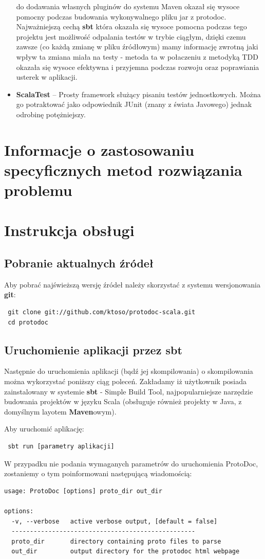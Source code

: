 \documentclass[a4paper]{article}
\begin{document}
\begin{itemize}
                                           do dodawania własnych pluginów do systemu Maven okazał się wysoce pomocny podczas budowania wykonywalnego pliku jar z protodoc.
                                           Najważniejszą cechą \textbf{sbt} która okazała się wysoce pomocna podczas tego projektu jest możliwość odpalania testów w trybie ciągłym,
                                           dzięki czemu zawsze (co każdą zmianę w pliku źródłowym) mamy informację zwrotną jaki wpływ ta zmiana miała na testy - metoda
                                           ta w połaczeniu z metodyką TDD okazała się wysoce efektywna i przyjemna podczas rozwoju oraz poprawiania usterek w aplikacji.
 \item \textbf{ScalaTest} -- Prosty framework służący pisaniu testów jednostkowych. Można go potraktować jako odpowiednik JUnit (znany z świata Javowego) jednak odrobinę potężniejszy.
\end{itemize}


\newpage
\section{Informacje o zastosowaniu specyficznych metod rozwiązania problemu}

\section{Instrukcja obsługi}
\subsection{Pobranie aktualnych źródeł}
Aby pobrać najświeższą wersję źródeł należy skorzystać z systemu wersjonowania \textbf{git}:
\begin{verbatim}
 git clone git://github.com/ktoso/protodoc-scala.git
 cd protodoc
\end{verbatim}

\subsection{Uruchomienie aplikacji przez sbt}
Następnie do uruchomienia aplikacji (bądź jej skompilowania) o skompilowania można wykorzystać poniższy ciąg poleceń.
Zakładamy iż użytkownik posiada zainstalowany w systemie \textbf{sbt} - Simple Build Tool, najpopularniejsze narzędzie budowania 
projektów w języku Scala (obsługuje również projekty w Java, z domyślnym layotem \textbf{Maven}owym).

Aby uruchomić aplikację:
\begin{verbatim}
 sbt run [parametry aplikacji]
\end{verbatim}
W przypadku nie podania wymaganych parametrów do uruchomienia ProtoDoc, zostaniemy o tym poinformowani następującą wiadomością:
\begin{verbatim}
usage: ProtoDoc [options] proto_dir out_dir

options:
  -v, --verbose   active verbose output, [default = false]
  --------------------------------------------------
  proto_dir       directory containing proto files to parse
  out_dir         output directory for the protodoc html webpage
\end{verbatim}
\end{document}
